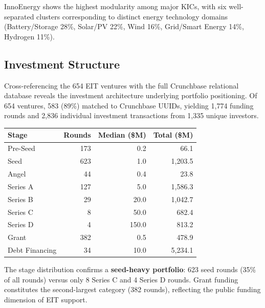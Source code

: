 \documentclass[../main.tex]{subfiles}
\begin{document}
InnoEnergy shows the highest modularity among major KICs, with six well-separated clusters corresponding to distinct energy technology domains (Battery/Storage 28\%, Solar/PV 22\%, Wind 16\%, Grid/Smart Energy 14\%, Hydrogen 11\%).

\subsection{Investment Structure}

Cross-referencing the 654 EIT ventures with the full Crunchbase relational
database reveals the investment architecture underlying portfolio
positioning.
Of 654 ventures, 583 (89\%) matched to
Crunchbase UUIDs, yielding 1,774 funding rounds and 2,836 individual
investment transactions from 1,335 unique investors.

\begin{center}
\scriptsize
\setlength{\tabcolsep}{4pt}
\begin{tabular}{lrrr}
\toprule
\textbf{Stage} & \textbf{Rounds} & \textbf{Median (\$M)} & \textbf{Total (\$M)} \\
\midrule
Pre-Seed & 173 & 0.2 & 66.1 \\
Seed & 623 & 1.0 & 1,203.5 \\
Angel & 44 & 0.4 & 23.8 \\
Series A & 127 & 5.0 & 1,586.3 \\
Series B & 29 & 20.0 & 1,042.7 \\
Series C & 8 & 50.0 & 682.4 \\
Series D & 4 & 150.0 & 813.2 \\
Grant & 382 & 0.5 & 478.9 \\
Debt Financing & 34 & 10.0 & 5,234.1 \\
\bottomrule
\end{tabular}
\end{center}

The stage distribution confirms a \textbf{seed-heavy portfolio}: 623 seed rounds
(35\% of all rounds) versus only 8 Series C and 4 Series D rounds.
Grant funding constitutes the second-largest category (382 rounds),
reflecting the public funding dimension of EIT support.
\end{document}

